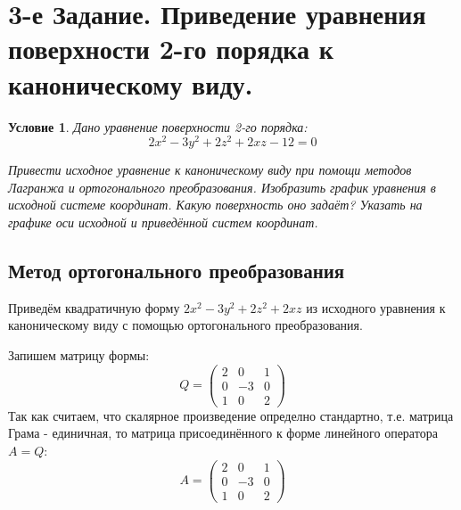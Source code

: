 \documentclass[12pt, a4paper]{article}
\newtheorem*{task}{Условие}
\begin{document}
\section{3-е Задание. Приведение уравнения поверхности 2-го порядка к каноническому виду.}
\begin{task}
Дано уравнение поверхности 2-го порядка:
\begin{equation*}
2x^2-3y^2+2z^2+2xz-12=0
\end{equation*}

Привести исходное уравнение к каноническому виду при помощи методов Лагранжа и ортогонального преобразования. Изобразить график уравнения в исходной системе координат. Какую поверхность оно задаёт? Указать на графике оси исходной и приведённой систем координат.
\end{task}
\subsection{Метод ортогонального преобразования}
Приведём квадратичную форму $2x^2-3y^2+2z^2+2xz$ из исходного уравнения к каноническому виду с помощью ортогонального преобразования.

Запишем матрицу формы:
\begin{equation*}
Q=\begin{pmatrix}
2 & 0 & 1\\
0 & -3 & 0\\
1 & 0 & 2
\end{pmatrix}
\end{equation*}
Так как считаем, что скалярное произведение определно стандартно, т.е. матрица Грама - единичная, то матрица присоединённого к форме линейного оператора $A=Q$:
\begin{equation*}
A=\begin{pmatrix}
2 & 0 & 1\\
0 & -3 & 0\\
1 & 0 & 2
\end{pmatrix}
\end{equation*}
\end{document}

